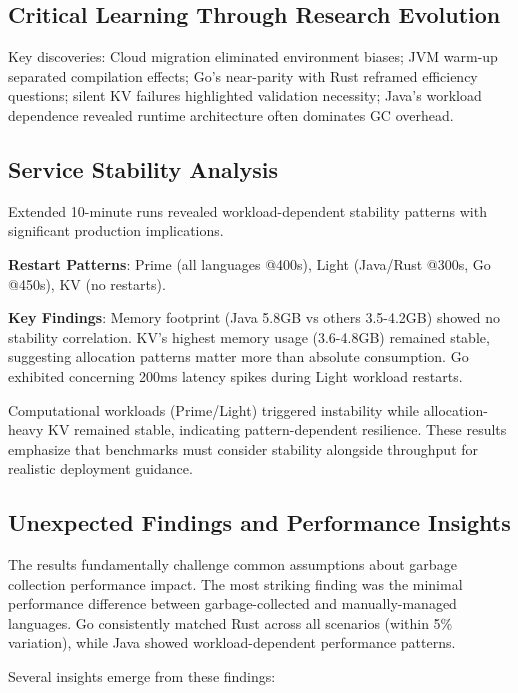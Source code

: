 \documentclass{article}
\begin{document}
\subsection{Critical Learning Through Research Evolution}

Key discoveries: Cloud migration eliminated environment biases; JVM warm-up separated compilation effects; Go's near-parity with Rust reframed efficiency questions; silent KV failures highlighted validation necessity; Java's workload dependence revealed runtime architecture often dominates GC overhead.

\subsection{Service Stability Analysis}
\label{sec:stability-analysis}

Extended 10-minute runs revealed workload-dependent stability patterns with significant production implications.

\textbf{Restart Patterns}: Prime (all languages @400s), Light (Java/Rust @300s, Go @450s), KV (no restarts).

\textbf{Key Findings}: Memory footprint (Java 5.8GB vs others 3.5-4.2GB) showed no stability correlation. KV's highest memory usage (3.6-4.8GB) remained stable, suggesting allocation patterns matter more than absolute consumption. Go exhibited concerning 200ms latency spikes during Light workload restarts.

Computational workloads (Prime/Light) triggered instability while allocation-heavy KV remained stable, indicating pattern-dependent resilience. These results emphasize that benchmarks must consider stability alongside throughput for realistic deployment guidance.

\subsection{Unexpected Findings and Performance Insights}

The results fundamentally challenge common assumptions about garbage collection performance impact. The most striking finding was the minimal performance difference between garbage-collected and manually-managed languages. Go consistently matched Rust across all scenarios (within 5\% variation), while Java showed workload-dependent performance patterns.

Several insights emerge from these findings:
\end{document}
